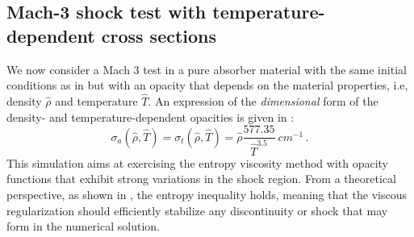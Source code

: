 \documentclass[times,doublespace]{fldauth}%
\begin{document}
\subsection{Mach-3 shock test with temperature-dependent cross sections}\label{sec:mach-3-no-cst-xs}
%
We now consider a Mach 3 test in a pure absorber material with the same initial conditions as in  but with an opacity that depends on the  material properties, i.e, density $\hat{\rho}$ and temperature $\hat{T}$. An expression of the \emph{dimensional} form of the density- and  temperature-dependent opacities is given in :
%
\begin{equation}\label{eq:opacity}
\sigma_a(\hat{\rho},\hat{T}) = \sigma_t(\hat{\rho},\hat{T}) = \hat{\rho} \frac{577.35}{\hat{T}^{3.5}} \ cm^{-1}\, .
\end{equation}
%
This simulation aims at exercising the entropy viscosity method with opacity functions that exhibit strong variations in the shock region. From a theoretical perspective, as shown in , the entropy inequality holds, meaning that the viscous regularization should efficiently stabilize any discontinuity or shock that may form in the numerical solution. 
\end{document}
